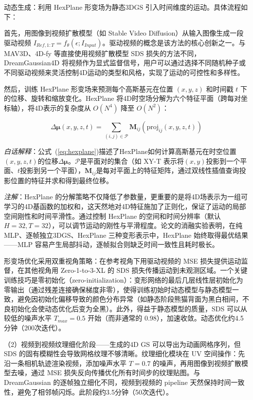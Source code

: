 动态生成：利用 HexPlane 形变场为静态3DGS 引入时间维度的运动。具体流程如下：

首先，用图像到视频扩散模型（如 Stable Video Diffusion）从输入图像生成一段驱动视频 $I_{Ref,1:T} = f_\theta(\epsilon; I_{Input})$。驱动视频的概念是该方法的核心创新之一。与 MAV3D、4D-fy 等直接使用视频扩散模型 SDS 损失的方法不同，DreamGaussian4D 将视频作为显式监督信号，用户可以通过选择不同随机种子或不同驱动视频来灵活控制4D运动的类型和风格，实现了运动的可控性和多样性。

然后，训练 HexPlane 形变场来预测每个高斯基元在位置 $(x,y,z)$ 和时间戳 $t$ 下的位移、旋转和缩放变化。HexPlane 将4D时空场分解为六个特征平面（跨每对坐标轴），将4D表示的复杂度从 $O(N^4)$ 降至 $O(N^2)$：

\begin{equation}
\label{eq:hexplane}
\Delta \boldsymbol{\mu}(x,y,z,t) = \sum_{(i,j) \in \mathcal{P}} \mathbf{M}_{ij}\!\left(\mathrm{proj}_{ij}(x,y,z,t)\right)
\end{equation}

\textit{白话解释}：公式~(\ref{eq:hexplane})描述了HexPlane如何计算高斯基元在时空位置$(x,y,z,t)$的位移$\Delta \boldsymbol{\mu}$。$\mathcal{P}$是平面对的集合（如 XY-T 表示将$(x,y)$投影到一个平面、$t$投影到另一个平面），$\mathbf{M}_{ij}$是每对平面上的特征矩阵，通过双线性插值查询投影位置的特征并求和得到最终位移。

\textit{注解}：HexPlane 的分解策略不仅降低了参数量，更重要的是将4D场表示为一组可学习的4D基函数的加权和，这天然地对4D特征施加了正则化，保证了运动的局部空间刚性和时间平滑性。通过控制 HexPlane 的空间和时间分辨率（默认 $H=32, T=32$），可以调节运动的刚性与平滑程度。论文的消融实验表明，在纯 MLP、逐帧独立3DGS、HexPlane 三种变形表示中，HexPlane 始终取得最优结果——MLP 容易产生局部抖动，逐帧拟合则缺乏时间一致性且耗时极长。

形变场优化采用双重视角策略：在参考视角下用驱动视频的 MSE 损失提供运动监督，在其他视角用 Zero-1-to-3-XL 的 SDS 损失传播运动到未观测区域。一个关键训练技巧是零初始化（zero-initialization）：变形网络的最后几层线性层初始化为零输出（通过残差连接确保梯度非零），使得训练初始时动态模型与静态模型一致，避免因初始化偏移导致的颜色分布异常（如静态阶段熊猫背面为黑白相间，不良初始化会使动态优化后变为全黑）。此外，得益于静态模型的质量，SDS 可以从较低的噪声水平 $T_{max}=0.5$ 开始（而非通常的 0.98），加速收敛。动态优化约4.5分钟（200次迭代）。

（2）视频到视频纹理细化阶段——生成的4D GS 可以导出为动画网格序列，但 SDS 的固有模糊性会导致网格纹理不够清晰。纹理细化模块在 UV 空间操作：先沿一条相机轨迹渲染视频，添加噪声水平 $T=0.7$ 的噪声，再用图像到视频扩散模型去噪，通过 MSE 损失反向传播优化所有时间步的纹理贴图。与 DreamGaussian 的逐帧独立细化不同，视频到视频的 pipeline 天然保持时间一致性，避免了相邻帧闪烁。此阶段约3.5分钟（50次迭代）。

